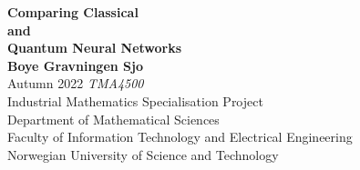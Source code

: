 \begin{titlepage}
    \begin{center}
        \vspace*{1cm}
        \Huge
        \textbf{Comparing Classical \\and\\ Quantum Neural Networks}\\

        \large
        \vspace{1.5cm}
        \textbf{Boye Gravningen Sjo}\\
        \vspace{0.5cm}
        Autumn 2022
        \vspace{0.5cm}
        \vfill
        \textit{TMA4500} \\[0.3cm]
        Industrial Mathematics Specialisation Project \\[0.3cm]
        Department of Mathematical Sciences \\[0.3cm]
        Faculty of Information Technology and Electrical Engineering \\[0.3cm]
        Norwegian University of Science and Technology
    \end{center}
\end{titlepage}
\thispagestyle{empty}
\cleardoublepage